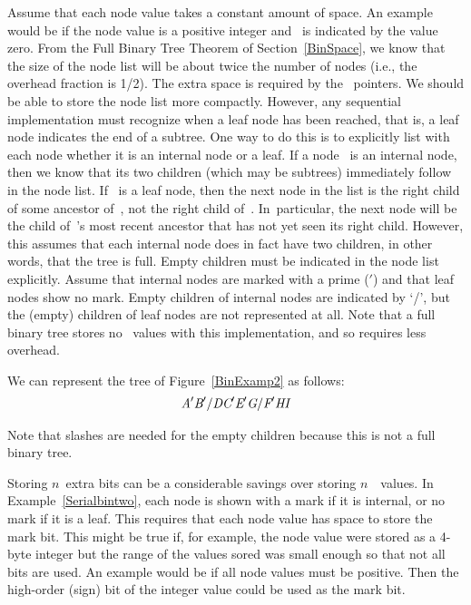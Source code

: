 Assume that each node value takes a constant amount of space.
An example would be if the node value is a positive integer and \NULL\
is indicated by the value zero.
From the Full Binary Tree Theorem of
Section~\ref{BinSpace},
we know that the size of the node list will be about twice the number
of nodes (i.e., the overhead fraction is 1/2).
The extra space is required by the \NULL\ pointers.
We should be able to store the node list more compactly.
However, any sequential implementation must recognize when a leaf node
has been reached, that is, a leaf node indicates the end of a subtree.
One way to do this is to explicitly list with each node whether it is
an internal node or a leaf.
If a node~ is an internal node, then we know that its two
children (which may be subtrees) immediately follow \svar{X} in the
node list.
If~ is a leaf node, then the next node in the list is the
right child of some ancestor of~, not the right child
of~.
In~particular, the next node will be the child of~\svar{X}'s most
recent ancestor that has not yet seen its right child.
However, this assumes that each internal node does in fact have two
children, in other words, that the tree is
full. 
Empty children must be indicated in the node list explicitly.
Assume that internal nodes are marked with a prime (\('\)) and that
leaf nodes show no mark.
Empty children of internal nodes are indicated by `/', but the (empty)
children of leaf nodes are not represented at all.
Note that a full binary tree stores no \NULL\ values with this
implementation, and so requires less overhead.

\begin{example}
\label{Serialbintwo}
We can represent the tree of Figure~\ref{BinExamp2} as follows:
\begin{eqnarray}
{\textit{A}}' {\textit{B}}' / {\textit{D}} {\textit{C}}' {\textit{E}}' {\textit{G}} /
{\textit{F}}' {\textit{H}} {\textit{I}}\label{SeqEqTwo}
\end{eqnarray}

\noindent Note that slashes are needed for the empty children because
this is not a full binary tree.
\end{example}

Storing \(n\)~extra bits can be a considerable savings over
storing \(n\)~\NULL\ values.
In Example~\ref{Serialbintwo}, each node is shown with a mark if it is
internal, or no mark if it is a leaf.
This requires that each node value has space to store the mark bit.
This might be true if, for example, the node value were stored as a
4-byte integer but the range of the values sored was small enough so
that not all bits are used.
An example would be if all node values must be positive.
Then the high-order (sign) bit of the integer value could be used as
the mark bit.

